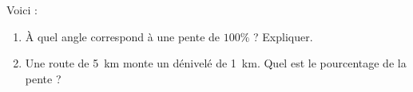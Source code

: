 
\begin{exercice}\label{exosmath-0836}

    Voici  :\\


\begin{enumerate}
    \item
        À quel angle correspond à une pente de \( 100\%\) ? Expliquer.
    \item
        Une route de \SI{5}{\kilo\meter} monte un dénivelé de \SI{1}{\kilo\meter}. Quel est le pourcentage de la pente ?
\end{enumerate}

\end{exercice}
